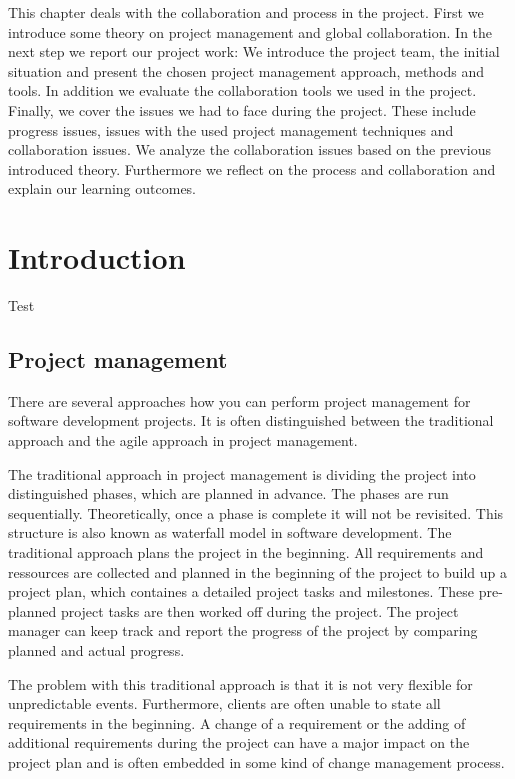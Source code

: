 This chapter deals with the collaboration and process in the project. First we introduce some theory on project management and global collaboration. In the next step we report our project work: We introduce the project team, the initial situation and present the chosen project management approach, methods and tools. In addition we evaluate the collaboration tools we used in the project. Finally, we cover the issues we had to face during the project. These include progress issues, issues with the used project management techniques and collaboration issues. We analyze the collaboration issues based on the previous introduced theory. Furthermore we reflect on the process and collaboration and explain our learning outcomes.


\section{Introduction}

Test

\subsection{Project management}

There are several approaches how you can perform project management for software development projects. It is often distinguished between the traditional approach and the agile approach in project management.

The traditional approach in project management is dividing the project into distinguished phases, which are planned in advance. The phases are run sequentially. Theoretically, once a phase is complete it will not be revisited. This structure is also known as waterfall model in software development.
The traditional approach plans the project in the beginning. All requirements and ressources are collected and planned in the beginning of the project to build up a project plan, which containes a detailed project tasks and milestones. These pre-planned project tasks are then worked off during the project. The project manager can keep track and report the progress of the project by comparing planned and actual progress.

The problem with this traditional approach is that it is not very flexible for unpredictable events. Furthermore, clients are often unable to state all requirements in the beginning. A change of a requirement or the adding of additional requirements during the project can have a major impact on the project plan and is often embedded in some kind of change management process.

